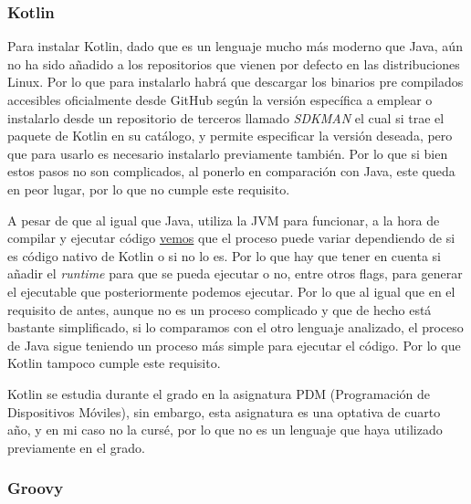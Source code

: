 \subsubsection{Kotlin}

\begin{todolist}
    \item Para instalar Kotlin, dado que es un lenguaje mucho más moderno que
    Java, aún no ha sido añadido a los repositorios que vienen por defecto en
    las distribuciones Linux. Por lo que para instalarlo habrá que descargar los
    binarios pre compilados accesibles oficialmente desde GitHub según la
    versión específica a emplear o instalarlo desde un repositorio de terceros
    llamado \emph{SDKMAN} el cual si trae el paquete de Kotlin en su catálogo, y
    permite especificar la versión deseada, pero que para usarlo es necesario
    instalarlo previamente también. Por lo que si bien estos pasos no son
    complicados, al ponerlo en comparación con Java, este queda en peor lugar,
    por lo que no cumple este requisito.
    \item A pesar de que al igual que Java, utiliza la JVM para funcionar, a la hora
    de compilar y ejecutar código
    \href{https://stackoverflow.com/a/69030563}{vemos} que el proceso puede
    variar dependiendo de si es código nativo de Kotlin o si no lo es. Por lo
    que hay que tener en cuenta si añadir el \emph{runtime} para que se pueda ejecutar
    o no, entre otros flags, para generar el ejecutable que posteriormente
    podemos ejecutar. Por lo que al igual que en el requisito de antes, aunque
    no es un proceso complicado y que de hecho está bastante simplificado, si lo
    comparamos con el otro lenguaje analizado, el proceso de Java sigue teniendo
    un proceso más simple para ejecutar el código. Por lo que Kotlin tampoco
    cumple este requisito. 
    \item Kotlin se estudia durante el grado en la asignatura PDM (Programación
    de Dispositivos Móviles), sin embargo, esta asignatura es una optativa de
    cuarto año, y en mi caso no la cursé, por lo que no es un lenguaje que haya
    utilizado previamente en el grado.
\end{todolist}

\subsubsection{Groovy}

